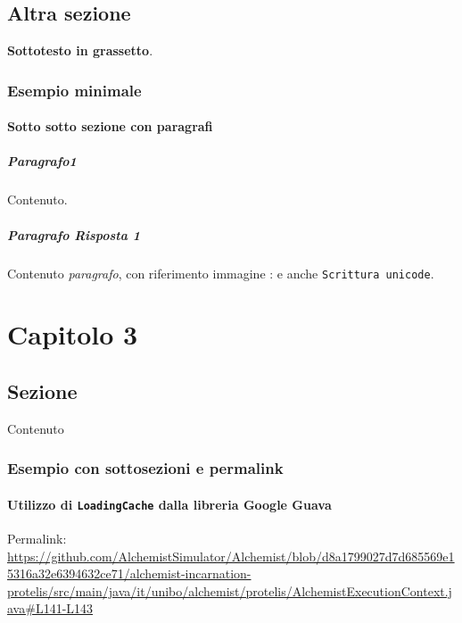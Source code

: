 \documentclass[a4paper,12pt]{report}
\begin{document}
\section{Altra sezione}

\textbf{Sottotesto in grassetto}.

\subsection*{Esempio minimale}

\subsubsection{Sotto sotto sezione con paragrafi}

\paragraph{Paragrafo1} Contenuto.

\paragraph{Paragrafo Risposta 1} Contenuto \textit{paragrafo}, con riferimento immagine
: e anche \texttt{Scrittura unicode}.

\chapter{Capitolo 3}
\section{Sezione}

Contenuto

\subsection{Esempio con sottosezioni e permalink}

\subsubsection{Utilizzo di \texttt{LoadingCache} dalla libreria Google Guava}

Permalink: \url{https://github.com/AlchemistSimulator/Alchemist/blob/d8a1799027d7d685569e15316a32e6394632ce71/alchemist-incarnation-protelis/src/main/java/it/unibo/alchemist/protelis/AlchemistExecutionContext.java#L141-L143}
\end{document}
